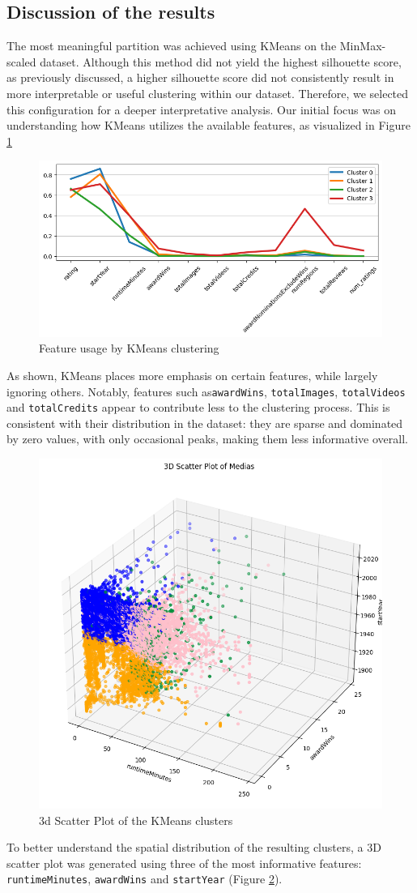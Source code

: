\documentclass[10pt]{article}
\begin{document}
\subsection{Discussion of the results}
The most meaningful partition was achieved using KMeans on the MinMax-scaled dataset. Although this method did not yield the highest silhouette score, as previously discussed, a higher silhouette score did not consistently result in more interpretable or useful clustering within our dataset. Therefore, we selected this configuration for a deeper interpretative analysis.
Our initial focus was on understanding how KMeans utilizes the available features, as visualized in Figure \ref{fig:km_f}
\begin{figure}[ht!]
    \centering
    \includegraphics[width=0.4\linewidth]{kmeans_features.png}
    \caption{Feature usage by KMeans clustering}
    \label{fig:km_f}
\end{figure}

As shown, KMeans places more emphasis on certain features, while largely ignoring others. Notably, features such as\texttt{awardWins}, \texttt{totalImages}, \texttt{totalVideos} and \texttt{totalCredits} appear to contribute less to the clustering process. This is consistent with their distribution in the dataset: they are sparse and dominated by zero values, with only occasional peaks, making them less informative overall.
\begin{figure}[ht!]
        \centering
        \includegraphics[width=0.4\linewidth]{3d_kmeans.png}
        \caption{3d Scatter Plot of the KMeans clusters}
        \label{fig:3d_km}
\end{figure}

To better understand the spatial distribution of the resulting clusters, a 3D scatter plot was generated using three of the most informative features:  \texttt{runtimeMinutes}, \texttt{awardWins} and \texttt{startYear} (Figure \ref{fig:3d_km}).
\end{document}
